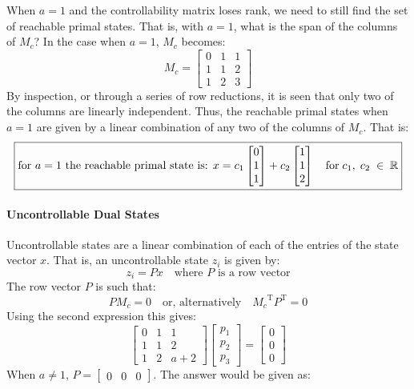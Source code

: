 When $a=1$ and the controllability matrix loses rank, we need to still find the set of reachable primal states.
That is, with $a=1$, what is the span of the columns of $M_{c}$? In the case when $a=1$, $M_{c}$ becomes:
\begin{equation*}
  M_{c}=
  \begin{bmatrix}
    0 & 1 & 1 \\
    1 & 1 & 2 \\
    1 & 2 & 3
  \end{bmatrix}
\end{equation*}
By inspection, or through a series of row reductions, it is seen that only two of the columns are linearly independent.
Thus, the reachable primal states when $a=1$ are given by a linear combination of any two of the columns of $M_{c}$.
That is:
\begin{equation*}
  \boxed{%
    \text{for $a=1$ the reachable primal state is: }x=c_{1}
    \begin{bmatrix}
      0 \\
      1 \\
      1
    \end{bmatrix}+c_{2}
    \begin{bmatrix}
      1 \\
      1 \\
      2
    \end{bmatrix}
    \quad \text{for}\;c_{1},\;c_{2}\;\in\;\mathbb{R}
  }
\end{equation*}

\paragraph{Uncontrollable Dual States}
Uncontrollable states are a linear combination of each of the entries of the state vector $x$.
That is, an uncontrollable state $z_{i}$ is given by:
\begin{equation*}
  z_{i}=Px \quad \text{where $P$ is a row vector}
\end{equation*}
The row vector $P$ is such that:
\begin{equation*}
  PM_{c}=0 \quad\text{or, alternatively}\quad {M_{c}}^{\text{T}}P^{\text{T}}=0
\end{equation*}
Using the second expression this gives:
\begin{equation*}
\begin{bmatrix}
    0 & 1 & 1 \\
    1 & 1 & 2 \\
    1 & 2 & a+2
  \end{bmatrix}
  \begin{bmatrix}
    p_{1} \\
    p_{2} \\
    p_{3}
  \end{bmatrix}=
  \begin{bmatrix}
    0 \\
    0 \\
    0
  \end{bmatrix}
\end{equation*}
When $a\neq1$, $P=\begin{bmatrix} 0 & 0 & 0 \end{bmatrix}$.
The answer would be given as:

